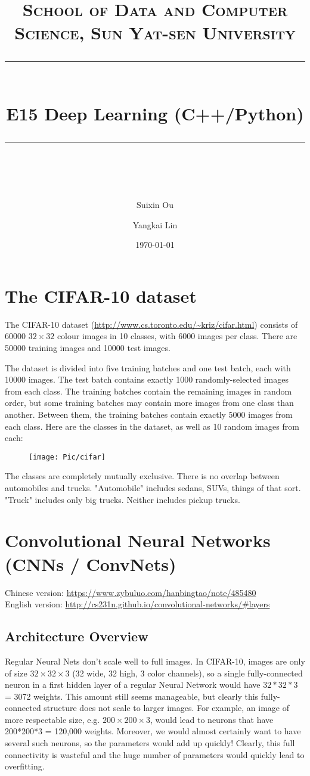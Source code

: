 \documentclass[UTF8, a4paper, 11pt]{article}
\title{	
\normalfont \normalsize
\textsc{School of Data and Computer Science, Sun Yat-sen University} \\ [25pt] %
\rule{\textwidth}{0.5pt} \\[0.4cm] %
\huge  E15 Deep Learning (C++/Python)\\ %
\rule{\textwidth}{2pt} \\[0.5cm] %
\author{Suixin Ou \and Yangkai Lin}
\date{\normalsize\today}
}
\begin{document}
\maketitle
\tableofcontents
\newpage
\section{The CIFAR-10 dataset}
The CIFAR-10 dataset (\url{http://www.cs.toronto.edu/~kriz/cifar.html}) consists of 60000 $32\times 32$ colour images in 10 classes, with 6000 images per class. There are 50000 training images and 10000 test images. 

The dataset is divided into five training batches and one test batch, each with 10000 images. The test batch contains exactly 1000 randomly-selected images from each class. The training batches contain the remaining images in random order, but some training batches may contain more images from one class than another. Between them, the training batches contain exactly 5000 images from each class. Here are the classes in the dataset, as well as 10 random images from each:
\begin{figure}[ht]
\centering
\texttt{[image: Pic/cifar]}
\end{figure}

The classes are completely mutually exclusive. There is no overlap between automobiles and trucks. "Automobile" includes sedans, SUVs, things of that sort. "Truck" includes only big trucks. Neither includes pickup trucks.
\section{Convolutional Neural Networks (CNNs / ConvNets)}
Chinese version: \url{https://www.zybuluo.com/hanbingtao/note/485480}\\
English version: \url{http://cs231n.github.io/convolutional-networks/#layers}
\subsection{Architecture Overview}
Regular Neural Nets don’t scale well to full images. In CIFAR-10, images are only of size $32\times 32\times 3$ (32 wide, 32 high, 3 color channels), so a single fully-connected neuron in a first hidden layer of a regular Neural Network would have $32*32*3$ = 3072 weights. This amount still seems manageable, but clearly this fully-connected structure does not scale to larger images. For example, an image of more respectable size, e.g. $200\times 200\times 3$, would lead to neurons that have 200*200*3 = 120,000 weights. Moreover, we would almost certainly want to have several such neurons, so the parameters would add up quickly! Clearly, this full connectivity is wasteful and the huge number of parameters would quickly lead to overfitting.
\end{document}

